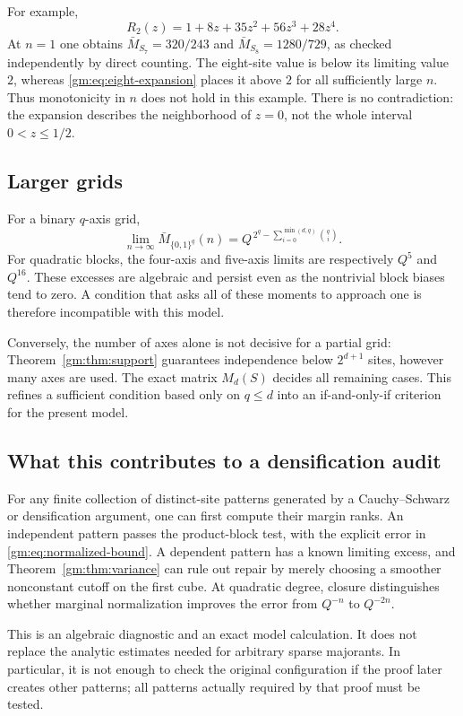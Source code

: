 \documentclass[11pt,a4paper]{article}
\numberwithin{equation}{section}
\theoremstyle{definition}
\theoremstyle{remark}
\newcommand{\1}{\mathbf 1}
\begin{document}
For example,
\[
 R_2(z)=1+8z+35z^2+56z^3+28z^4.
\]
At $n=1$ one obtains $\bar M_{S_7}=320/243$ and
$\bar M_{S_8}=1280/729$, as checked independently by direct counting.
The eight-site value is below its limiting value $2$, whereas
\eqref{gm:eq:eight-expansion} places it above $2$ for all sufficiently
large $n$. Thus monotonicity in $n$ does not hold in this example.
There is no contradiction: the expansion describes the neighborhood of
$z=0$, not the whole interval $0<z\leq1/2$.

\subsection{Larger grids}
For a binary $q$-axis grid,
\begin{equation}\label{gm:eq:binary-limit}
 \lim_{n\to\infty}\bar M_{\{0,1\}^q}(n)
   =Q^{\,2^q-\sum_{i=0}^{\min(d,q)}\binom qi}.
\end{equation}
For quadratic blocks, the four-axis and five-axis limits are respectively
$Q^5$ and $Q^{16}$. These excesses are algebraic and persist even as the
nontrivial block biases tend to zero. A condition that asks all of these
moments to approach one is therefore incompatible with this model.

Conversely, the number of axes alone is not decisive for a partial grid:
Theorem~\ref{gm:thm:support} guarantees independence below $2^{d+1}$ sites,
however many axes are used. The exact matrix $M_d(S)$ decides all remaining
cases. This refines a sufficient condition based only on $q\leq d$ into
an if-and-only-if criterion for the present model.

\subsection{What this contributes to a densification audit}
For any finite collection of distinct-site patterns generated by a
Cauchy--Schwarz or densification argument, one can first compute their
margin ranks. An independent pattern passes the product-block test, with
the explicit error in \eqref{gm:eq:normalized-bound}. A dependent pattern
has a known limiting excess, and Theorem~\ref{gm:thm:variance} can rule out
repair by merely choosing a smoother nonconstant cutoff on the first
cube. At quadratic degree, closure distinguishes whether marginal
normalization improves the error from $Q^{-n}$ to $Q^{-2n}$.

This is an algebraic diagnostic and an exact model calculation. It does
not replace the analytic estimates needed for arbitrary sparse
majorants. In particular, it is not enough to check the original
configuration if the proof later creates other patterns; all patterns
actually required by that proof must be tested.
\end{document}
